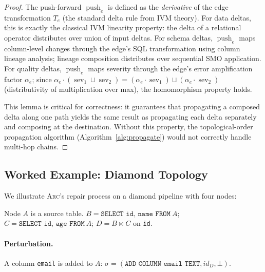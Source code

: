 \documentclass[sigplan,screen,nonacm]{acmart}
\newcommand{\arc}{\textsc{Arc}\xspace}
\newcommand{\push}{\operatorname{push}}
\newcommand{\severity}{\operatorname{sev}}
\begin{document}
\begin{proof}
The push-forward $\push_e$ is defined as the \emph{derivative} of the
edge transformation $T_e$ (the standard delta rule from IVM theory).
For data deltas, this is exactly the classical IVM linearity property:
the delta of a relational operator distributes over union of input
deltas.  For schema deltas, $\push_e$ maps column-level changes through
the edge's SQL transformation using column lineage analysis; lineage
composition distributes over sequential SMO application.  For quality
deltas, $\push_e$ maps severity through the edge's error amplification
factor $\alpha_e$; since $\alpha_e \cdot (\severity_1 \sqcup \severity_2)
= (\alpha_e \cdot \severity_1) \sqcup (\alpha_e \cdot \severity_2)$
(distributivity of multiplication over max), the homomorphism property
holds.

This lemma is critical for correctness: it guarantees that propagating
a composed delta along one path yields the same result as propagating
each delta separately and composing at the destination.  Without this
property, the topological-order propagation algorithm
(Algorithm~\ref{alg:propagate}) would not correctly handle multi-hop
chains.
\end{proof}

\subsection{Worked Example: Diamond Topology}\label{sec:example}

We illustrate \arc's repair process on a diamond pipeline with four nodes:

\begin{center}
\end{center}

Node $A$ is a source table.  $B =
\texttt{SELECT id, name FROM}~A$; $C = \texttt{SELECT id, age FROM}~A$;
$D = B \bowtie C$ on \texttt{id}.

\paragraph{Perturbation.}
A column \texttt{email} is added to $A$:
$\sigma = (\texttt{ADD COLUMN email TEXT}, \mathit{id}_D, \bot)$.
\end{document}
